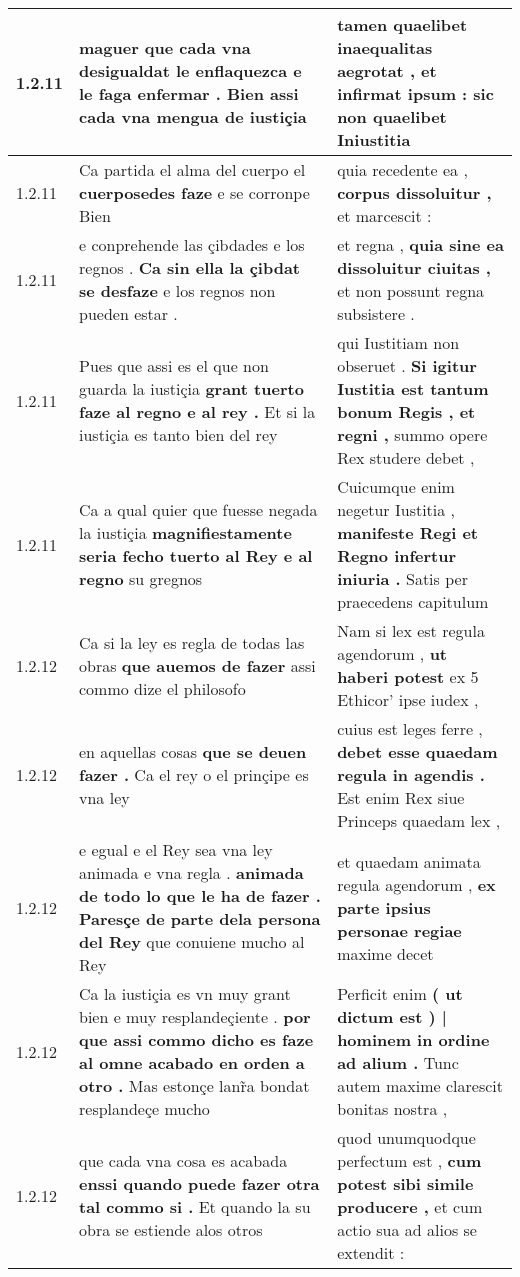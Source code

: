 \begin{tabular}{|p{1cm}|p{6.5cm}|p{6.5cm}|}
1.2.11 & maguer que cada vna desigualdat le enflaquezca \textbf{ e le faga enfermar . } Bien assi cada vna mengua de iustiçia & tamen quaelibet inaequalitas aegrotat , \textbf{ et infirmat ipsum : } sic non quaelibet Iniustitia \\\hline
1.2.11 & Ca partida el alma del cuerpo el \textbf{ cuerposedes faze } e se corronpe Bien & quia recedente ea , \textbf{ corpus dissoluitur , } et marcescit : \\\hline
1.2.11 & e conprehende las çibdades e los regnos . \textbf{ Ca sin ella la çibdat se desfaze } e los regnos non pueden estar . & et regna , \textbf{ quia sine ea dissoluitur ciuitas , } et non possunt regna subsistere . \\\hline
1.2.11 & Pues que assi es el que non guarda la iustiçia \textbf{ grant tuerto faze al regno e al rey . } Et si la iustiçia es tanto bien del rey & qui Iustitiam non obseruet . \textbf{ Si igitur Iustitia est tantum bonum Regis , et regni , } summo opere Rex studere debet , \\\hline
1.2.11 & Ca a qual quier que fuesse negada la iustiçia \textbf{ magnifiestamente seria fecho tuerto al Rey e al regno } su gregnos & Cuicumque enim negetur Iustitia , \textbf{ manifeste Regi et Regno infertur iniuria . } Satis per praecedens capitulum \\\hline
1.2.12 & Ca si la ley es regla de todas las obras \textbf{ que auemos de fazer } assi commo dize el philosofo & Nam si lex est regula agendorum , \textbf{ ut haberi potest } ex 5 Ethicor’ ipse iudex , \\\hline
1.2.12 & en aquellas cosas \textbf{ que se deuen fazer . } Ca el rey o el prinçipe es vna ley & cuius est leges ferre , \textbf{ debet esse quaedam regula in agendis . } Est enim Rex siue Princeps quaedam lex , \\\hline
1.2.12 & e egual e el Rey sea vna ley animada e vna regla . \textbf{ animada de todo lo que le ha de fazer . Paresçe de parte dela persona del Rey } que conuiene mucho al Rey & et quaedam animata regula agendorum , \textbf{ ex parte ipsius personae regiae } maxime decet \\\hline
1.2.12 & Ca la iustiçia es vn muy grant bien e muy resplandeçiente . \textbf{ por que assi commo dicho es faze al omne acabado en orden a otro . } Mas estonçe lanr̃a bondat resplandeçe mucho & Perficit enim \textbf{ ( ut dictum est ) | hominem in ordine ad alium . } Tunc autem maxime clarescit bonitas nostra , \\\hline
1.2.12 & que cada vna cosa es acabada \textbf{ enssi quando puede fazer otra tal commo si . } Et quando la su obra se estiende alos otros & quod unumquodque perfectum est , \textbf{ cum potest sibi simile producere , } et cum actio sua ad alios se extendit : \\\hline

\end{tabular}
